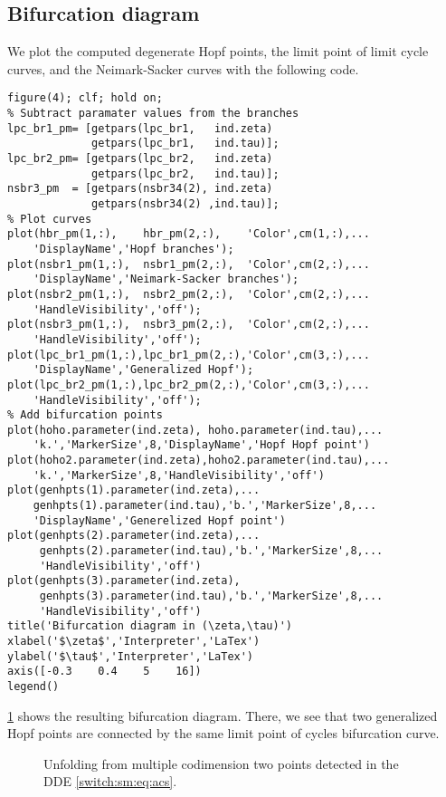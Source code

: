 \subsection{Bifurcation diagram} \label{switch:sm:sec:acs_bifurcation_diagram}
We plot the computed degenerate Hopf points, the limit point of limit cycle curves, and the Neimark-Sacker curves with the following code.
\begin{lstlisting}[style=customMatlab]
%% Bifurcation diagram in $(\zeta,\tau)$
figure(4); clf; hold on;
% Subtract paramater values from the branches
lpc_br1_pm= [getpars(lpc_br1,   ind.zeta)
             getpars(lpc_br1,   ind.tau)];
lpc_br2_pm= [getpars(lpc_br2,   ind.zeta)
             getpars(lpc_br2,   ind.tau)];
nsbr3_pm  = [getpars(nsbr34(2), ind.zeta)
             getpars(nsbr34(2) ,ind.tau)];
% Plot curves
plot(hbr_pm(1,:),    hbr_pm(2,:),    'Color',cm(1,:),...
    'DisplayName','Hopf branches');
plot(nsbr1_pm(1,:),  nsbr1_pm(2,:),  'Color',cm(2,:),...
    'DisplayName','Neimark-Sacker branches');
plot(nsbr2_pm(1,:),  nsbr2_pm(2,:),  'Color',cm(2,:),...
    'HandleVisibility','off');
plot(nsbr3_pm(1,:),  nsbr3_pm(2,:),  'Color',cm(2,:),...
    'HandleVisibility','off');
plot(lpc_br1_pm(1,:),lpc_br1_pm(2,:),'Color',cm(3,:),...
    'DisplayName','Generalized Hopf');
plot(lpc_br2_pm(1,:),lpc_br2_pm(2,:),'Color',cm(3,:),...
    'HandleVisibility','off');
% Add bifurcation points
plot(hoho.parameter(ind.zeta), hoho.parameter(ind.tau),...
    'k.','MarkerSize',8,'DisplayName','Hopf Hopf point')
plot(hoho2.parameter(ind.zeta),hoho2.parameter(ind.tau),...
    'k.','MarkerSize',8,'HandleVisibility','off')
plot(genhpts(1).parameter(ind.zeta),...
    genhpts(1).parameter(ind.tau),'b.','MarkerSize',8,...
    'DisplayName','Generelized Hopf point')
plot(genhpts(2).parameter(ind.zeta),...
     genhpts(2).parameter(ind.tau),'b.','MarkerSize',8,...
     'HandleVisibility','off')
plot(genhpts(3).parameter(ind.zeta),
     genhpts(3).parameter(ind.tau),'b.','MarkerSize',8,...
     'HandleVisibility','off')
title('Bifurcation diagram in (\zeta,\tau)')
xlabel('$\zeta$','Interpreter','LaTex')
ylabel('$\tau$','Interpreter','LaTex')
axis([-0.3    0.4    5    16])
legend()
\end{lstlisting}
\cref{switch:sm:fig:acs_hoho_genh_lpc_ns} shows the resulting bifurcation diagram. There, we see that two generalized Hopf points are connected by the same limit point of cycles bifurcation curve.
\begin{figure}
\centering
{}
\caption{Unfolding from multiple codimension two points detected in the DDE \cref{switch:sm:eq:acs}.}
\label{switch:sm:fig:acs_hoho_genh_lpc_ns}
\end{figure}

